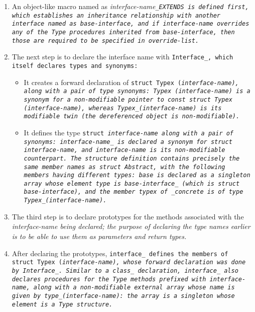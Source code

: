 \begin{enumerate}

\item An object-like macro named as \it{interface-name}\tt{_EXTENDS} is
defined first, which establishes an inheritance relationship with another
interface named as \it{base-interface}, and if \it{interface-name} overrides
any of the \tt{Type} procedures inherited from \it{base-interface},
then those are required to be specified in \it{override-list}.

\item The next step is to declare the interface name with
\tt{Interface_}, which itself declares types and synonyms:

\begin{itemize}

\item It creates a forward declaration of
\tt{struct Typex (}\it{interface-name}\tt{)}, along with a pair of type synonyms:
\tt{Typex (}\it{interface-name}\tt{)} is a synonym for a non-modifiable
pointer to \tt{const struct Typex (}\it{interface-name}\tt{)}, whereas
\tt{Typex_(}\it{interface-name}\tt{)} is its modifiable twin
(the dereferenced object is non-modifiable).

\item It defines the type \tt{struct} \it{interface-name} along with a
pair of synonyms: \it{interface-name}\_ is declared a synonym for \tt{struct}
\it{interface-name}, and \tt{interface-name} is its non-modifiable counterpart.
The structure definition contains precisely the same member names as
\tt{struct Abstract}, with the following members having different types:
\tt{base} is declared as a singleton array whose element type is
\it{base-interface}\_ (which is \tt{struct} \it{base-interface}), and the member
\tt{typex} of \tt{_concrete} is of type \tt{Typex_(}\it{interface-name}\tt{)}.

\end{itemize}

\item The third step is to declare prototypes for the methods associated with
the \it{interface-name} being declared; the purpose of declaring the type
names earlier is to be able to use them as parameters and return types.

\item After declaring the prototypes, \tt{interface_} defines
the members of \tt{struct Typex (}\it{interface-name}\tt{)},
whose forward declaration was done by \tt{Interface_}.
Similar to a \tt{class_} declaration, \tt{interface_} also declares
procedures for the \tt{Type} methods prefixed with \it{interface-name},
along with a non-modifiable external array whose name is given by
\tt{type_(}\it{interface-name}\tt{)}: the array is
a singleton whose element is a \tt{Type} structure.

\end{enumerate}

